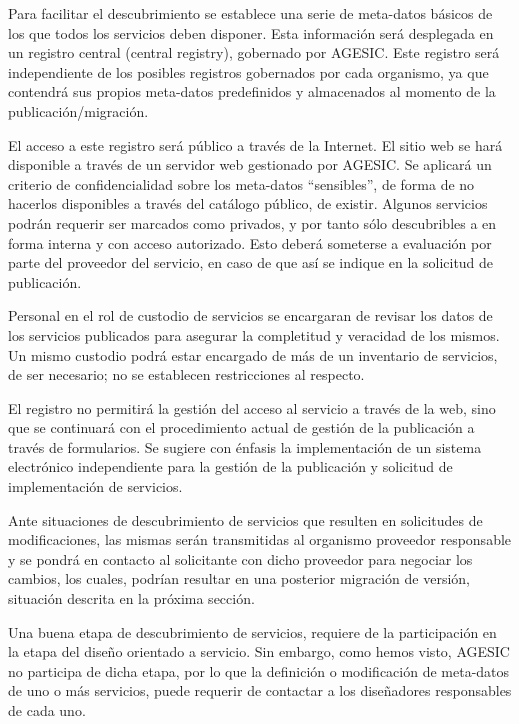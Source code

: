       Para facilitar el descubrimiento se establece una serie de meta-datos básicos de los que todos los servicios deben disponer. Esta información será desplegada en un registro central (central registry), gobernado por AGESIC. Este registro será independiente de los posibles registros gobernados por cada organismo, ya que contendrá sus propios meta-datos predefinidos y almacenados al momento de la publicación/migración.

      El acceso a este registro será público a través de la Internet. El sitio web se hará disponible a través de un servidor web gestionado por AGESIC. Se aplicará un criterio de confidencialidad sobre los meta-datos “sensibles”, de forma de no hacerlos disponibles a través del catálogo público, de existir.
      Algunos servicios podrán requerir ser marcados como privados, y por tanto sólo descubribles a en forma interna y con acceso autorizado. Esto deberá someterse a evaluación por parte del proveedor del servicio, en caso de que así se indique en la solicitud de publicación.

      Personal en el rol de custodio de servicios se encargaran de revisar los datos de los servicios publicados para asegurar la completitud y veracidad de los mismos. Un mismo custodio podrá estar encargado de más de un inventario de servicios, de ser necesario; no se establecen restricciones al respecto.

      El registro no permitirá la gestión del acceso al servicio a través de la web, sino que se continuará con el procedimiento actual de gestión de la publicación a través de formularios. Se sugiere con énfasis la implementación de un sistema electrónico independiente para la gestión de la publicación y solicitud de implementación de servicios.

      Ante situaciones de descubrimiento de servicios que resulten en solicitudes de modificaciones, las mismas serán transmitidas al organismo proveedor responsable y se pondrá en contacto al solicitante con dicho proveedor para negociar los cambios, los cuales, podrían resultar en una posterior migración de versión, situación descrita en la próxima sección.

      Una buena etapa de descubrimiento de servicios, requiere de la participación en la etapa del diseño orientado a servicio. Sin embargo, como hemos visto, AGESIC no participa de dicha etapa, por lo que la definición o modificación de meta-datos de uno o más servicios, puede requerir de contactar a los diseñadores responsables de cada uno.

